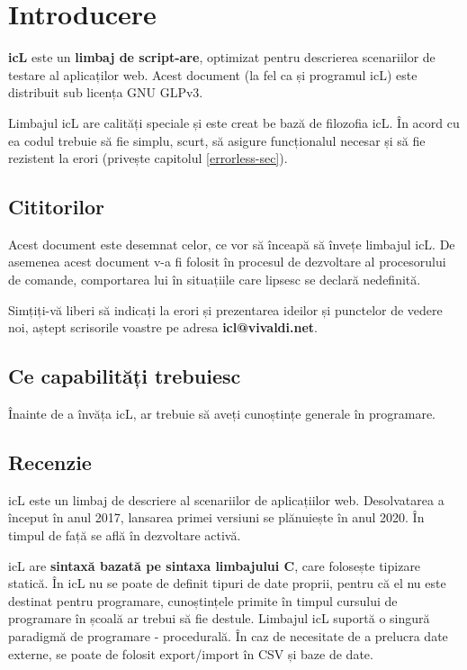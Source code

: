 \section{Introducere}

\indent \textbf{icL} este un \textbf{limbaj de script-are}, optimizat pentru descrierea scenariilor de testare al aplicaților web. Acest document (la fel ca și programul icL) este distribuit sub licența GNU GLPv3.

Limbajul icL are calități speciale și este creat be bază de filozofia icL. În acord cu ea codul trebuie să fie simplu, scurt, să asigure funcționalul necesar și să fie rezistent la erori (privește capitolul \ref{errorless-sec}).

\subsection{Cititorilor}

Acest document este desemnat celor, ce vor să înceapă să învețe limbajul icL. De asemenea acest document v-a fi folosit în procesul de dezvoltare al procesorului de comande, comportarea lui în situațiile care lipsesc se declară nedefinită.

Simțiți-vă liberi să indicați la erori și prezentarea ideilor și punctelor de vedere noi, aștept scrisorile voastre pe adresa {\bf icl@vivaldi.net}.

\subsection{Ce capabilități trebuiesc}

Înainte de a învăța icL, ar trebuie să aveți cunoștințe generale în programare.

\subsection{Recenzie}

icL este un limbaj de descriere al scenariilor de aplicațiilor web. Desolvatarea a început în anul 2017, lansarea primei versiuni se plănuiește în anul 2020. În timpul de față se află în dezvoltare activă.

icL are \textbf{sintaxă bazată pe sintaxa limbajului C}, care folosește tipizare statică. În icL nu se poate de definit tipuri de date proprii, pentru că el nu este destinat pentru programare, cunoștințele primite în timpul cursului de programare în școală ar trebui să fie destule. Limbajul icL suportă o singură paradigmă de programare - procedurală. În caz de necesitate de a prelucra date externe, se poate de folosit export/import în CSV și baze de date.

